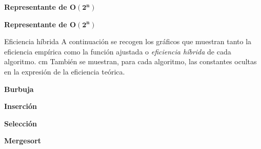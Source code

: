 \documentclass[spanish]{beamer}
\begin{document}
\begin{frame}
\vspace{2em}
\textbf{Representante de $\boldsymbol{O(2^n)}$}
	\begin{center}
		
	\end{center}
\end{frame}

\begin{frame}
\vspace{2em}
\textbf{Representante de $\boldsymbol{O(2^n)}$}
	\begin{center}
		
	\end{center}
\end{frame}

\begin{frame}{Eficiencia híbrida}
	A continuación se recogen los gráficos que muestran tanto la eficiencia empírica como la función ajustada o \textit{eficiencia híbrida} de cada algoritmo.	
	 cm
	También se muestran, para cada algoritmo, las constantes ocultas en la expresión de la eficiencia teórica.
\end{frame}

\begin{frame}
    \vspace{2.5em}
    \textbf{Burbuja}
	\fontsize{8pt}{7.2}\selectfont
	\begin{center}
		
	\end{center}
\end{frame}

\begin{frame}
    \vspace{2.5em}
    \textbf{Inserción}
	\fontsize{8pt}{7.2}\selectfont
	\begin{center}
		
	\end{center}
\end{frame}

\begin{frame}
    \vspace{2.5em}
    \textbf{Selección}
	\fontsize{8pt}{7.2}\selectfont
	\begin{center}
		
	\end{center}
\end{frame}

\begin{frame}
    \vspace{2.5em}
    \textbf{Mergesort}
	\fontsize{5.8pt}{7.2}\selectfont
	\begin{center}
		
	\end{center}
\end{frame}
\end{document}
